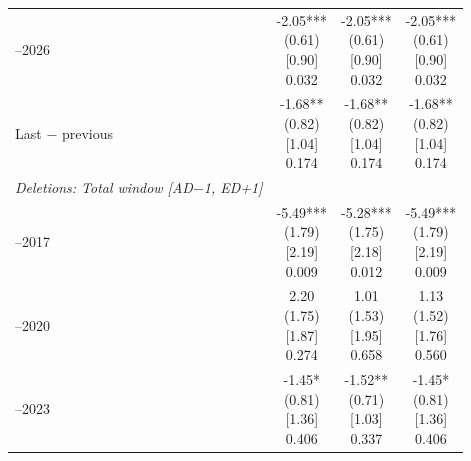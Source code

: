 \begin{threeparttable}
\begin{tabular}{@{}lccc}
\addlinespace[0.25ex]
\addlinespace[0.25ex]
2024–2026 & \makecell{-2.05***\\(0.61)\\{}[0.90]\\{0.032}} & \makecell{-2.05***\\(0.61)\\{}[0.90]\\{0.032}} & \makecell{-2.05***\\(0.61)\\{}[0.90]\\{0.032}} \\
\addlinespace[0.25ex]
\addlinespace[0.25ex]
Last $-$ previous & \makecell{-1.68**\\(0.82)\\{}[1.04]\\{0.174}} & \makecell{-1.68**\\(0.82)\\{}[1.04]\\{0.174}} & \makecell{-1.68**\\(0.82)\\{}[1.04]\\{0.174}} \\
\addlinespace[0.25ex]
\midrule
\emph{Deletions: Total window [AD$-$1, ED+1]} \\
\addlinespace[0.25ex]
\addlinespace[1ex]
2013–2017 & \makecell{-5.49***\\(1.79)\\{}[2.19]\\{0.009}} & \makecell{-5.28***\\(1.75)\\{}[2.18]\\{0.012}} & \makecell{-5.49***\\(1.79)\\{}[2.19]\\{0.009}} \\
\addlinespace[0.25ex]
\addlinespace[0.25ex]
2018–2020 & \makecell{2.20\\(1.75)\\{}[1.87]\\{0.274}} & \makecell{1.01\\(1.53)\\{}[1.95]\\{0.658}} & \makecell{1.13\\(1.52)\\{}[1.76]\\{0.560}} \\
\addlinespace[0.25ex]
\addlinespace[0.25ex]
2021–2023 & \makecell{-1.45*\\(0.81)\\{}[1.36]\\{0.406}} & \makecell{-1.52**\\(0.71)\\{}[1.03]\\{0.337}} & \makecell{-1.45*\\(0.81)\\{}[1.36]\\{0.406}} \\

\end{tabular}
\end{threeparttable}
